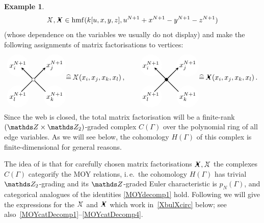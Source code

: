 \documentclass{compositio}
\theoremstyle{definition}
\newtheorem{example}[theorem]{Example}
\numberwithin{equation}{section}
\DeclareMathOperator{\hmf}{hmf}
\begin{document}
\begin{example}
\[
\Xcirc, \Xbul \in \hmf( k[u,x,y,z], u^{N+1} +x^{N+1} - y^{N+1} - z^{N+1} )
\]
(whose dependence on the variables we usually do not display) and make the following assignments of matrix factorisations to vertices: 
\begin{equation}
\label{MFcrossings}
\begin{tikzpicture}[scale=0.7,baseline, inner sep=1mm, >=stealth]
\node (1) at (-1.1,1.0) [circle,inner sep=1.5pt, draw=white,fill= white] {$x^{N+1}_{i}$};
\node (2) at (1.5,1.0) [circle,inner sep=1.5pt, draw=white,fill= white] {$x^{N+1}_{j}$};
\node (3) at (1.5,-1.2) [circle,inner sep=1.5pt, draw=white,fill= white] {$x^{N+1}_{k}$};
\node (3) at (-1.1,-1.2) [circle,inner sep=1.5pt, draw=white,fill= white] {$x^{N+1}_{l}$};
\node (0) at (0,0) [circle,inner sep=1.5pt, thin,draw=black,fill= white] {};
\node (bl) at (-1,-1) [circle] {};
\node (br) at (1,-1) [circle] {};
\node (tl) at (-1,1) [circle] {};
\node (tr) at (1,1) [circle] {};
\draw[-,  thick] (bl) -- (0); 
\draw[-,  thick] (br) -- (0); 
\draw[->,  thick] (0) -- (tl); 
\draw[->,  thick] (0) -- (tr); 
\end{tikzpicture}
\widehat = \,
\Xcirc(x_{i},x_{j},x_{k},x_{l}) \, ,
\qquad 
\begin{tikzpicture}[scale=0.7,baseline, inner sep=1mm, >=stealth]
\node (1) at (-1.1,1.0) [circle,inner sep=1.5pt, draw=white,fill= white] {$x^{N+1}_{i}$};
\node (2) at (1.5,1.0) [circle,inner sep=1.5pt, draw=white,fill= white] {$x^{N+1}_{j}$};
\node (3) at (1.5,-1.2) [circle,inner sep=1.5pt, draw=white,fill= white] {$x^{N+1}_{k}$};
\node (3) at (-1.1,-1.2) [circle,inner sep=1.5pt, draw=white,fill= white] {$x^{N+1}_{l}$};
\node (0) at (0,0) [circle,inner sep=1.5pt, thin,draw=black,fill= black] {};
\node (bl) at (-1,-1) [circle] {};
\node (br) at (1,-1) [circle] {};
\node (tl) at (-1,1) [circle] {};
\node (tr) at (1,1) [circle] {};
\draw[-,  thick] (bl) -- (0); 
\draw[-,  thick] (br) -- (0); 
\draw[->,  thick] (0) -- (tl); 
\draw[->,  thick] (0) -- (tr); 
\end{tikzpicture}
\widehat = \,
\Xbul (x_{i},x_{j},x_{k},x_{l}) \, .
\end{equation}
Since the web is closed, the total matrix factorisation will be a finite-rank $(\ZZ \times \Ztwo)$-graded complex $C(\Gamma)$ over the polynomial ring of all edge variables. As we will see below, the cohomology $H(\Gamma)$ of this complex is finite-dimensional for general reasons.

The idea of \cite{kr0401268} is that for carefully chosen matrix factorisations $\Xbul, \Xcirc$ the complexes $C(\Gamma)$ categorify the MOY relations, i.\,e.~the cohomology $H(\Gamma)$ has trivial $\Ztwo$-grading and its $\ZZ$-graded Euler characteristic is $p_N(\Gamma)$, and categorical analogues of the identities \eqref{MOYdecomp1} hold. Following \cite{kr0401268} we will give the expressions for the $\Xcirc$ and $\Xbul$ which work in~\eqref{XbulXcirc} below; see also~\eqref{MOYcatDecomp1}--\eqref{MOYcatDecomp4}.
\end{example}
\end{document}

